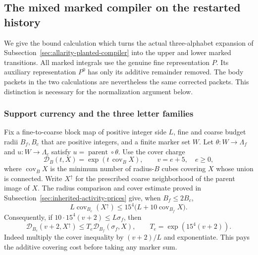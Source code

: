 \subsection{The mixed marked compiler on the restarted history}
\label{sec:actual-mixed-marked-compiler}

We give the bound calculation which turns the actual three-alphabet
expansion of Subsection~\ref{sec:allarity-planted-compiler} into the upper
and lower marked transitions. All marked integrals use the genuine fine
representation $P$. Its auxiliary representation $P^0$ has only its
additive remainder removed. The body packets in the two calculations
are nevertheless the same corrected packets. This distinction is
necessary for the normalization argument below.

\subsubsection{Support currency and the three letter families}

Fix a fine-to-coarse block map of positive integer side $L$, fine and
coarse budget radii $B_f,B_c$ that are positive integers, and a finite
marker set $W$. Let
$\theta:W\to\Lambda_f$ and $u:W\to\Lambda_c$ satisfy
$u=\operatorname{parent}\circ\theta$. Use the cover charge
\[
 \mathcal D_B(t,X)=\exp(t\,\operatorname{cov}_B X),\qquad
 v=e+5,\quad e\ge0,
\]
where $\operatorname{cov}_B X$ is the minimum number of radius-$B$
cubes covering $X$ whose union is connected. Write $X^\uparrow$ for the prescribed coarse
neighborhood of the parent image of $X$. The radius comparison and
cover estimate proved in Subsection~\ref{sec:inherited-activity-prices}
give, when $B_f\le2B_c$,
\[
 L\operatorname{cov}_{B_c}(X^\uparrow)
       \le15^4\bigl(L+10\operatorname{cov}_{B_f}X\bigr).
\]
Consequently, if $10\cdot15^4(v+2)\le L\sigma_f$, then
\begin{equation}\label{eq:mixed-cover-charge}
 \mathcal D_{B_c}(v+2,X^\uparrow)
 \le T_e\mathcal D_{B_f}(\sigma_f,X),
 \qquad T_e=\exp(15^4(v+2)).
\end{equation}
Indeed multiply the cover inequality by $(v+2)/L$ and exponentiate.
This pays the additive covering cost before taking any marker sum.

